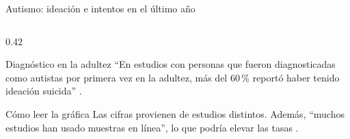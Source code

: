 \begin{frame}{Autismo: ideación e intentos en el último año}
\begin{columns}[T,onlytextwidth]
\begin{column}{0.42\textwidth}
      \begin{block}{Diagnóstico en la adultez}
        \scriptsize
        \enquote{En estudios con personas que fueron diagnosticadas como autistas
        por primera vez en la adultez, más del 60\,\% reportó haber tenido
        ideación suicida} \citep{conner2023}.
      \end{block}
      \begin{alertblock}{Cómo leer la gráfica}
        \scriptsize
        Las cifras provienen de estudios distintos. Además, \enquote{muchos
        estudios han usado muestras en línea}, lo que podría elevar las tasas
        \citep{conner2023}.
      \end{alertblock}
    \end{column}
  \end{columns}
\end{frame}

